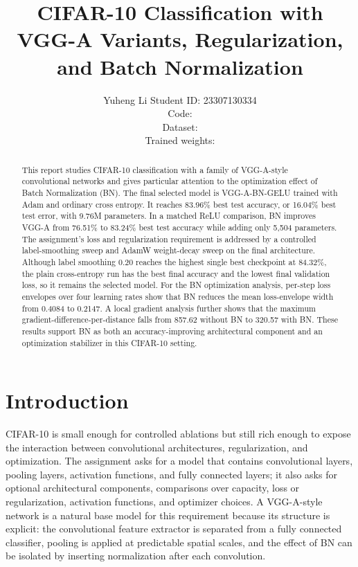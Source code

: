 \documentclass[10pt,twocolumn]{article}
\title{\vspace{-0.40in}CIFAR-10 Classification with VGG-A Variants, Regularization, and Batch Normalization}
\author{\small Yuheng Li \quad Student ID: 23307130334\\
\small Code: \githubrepo\\
\small Dataset: \cifarten\\
\small Trained weights: \modelscope}
\date{}
\begin{document}
\maketitle
\vspace{-0.20in}

\begin{abstract}
This report studies CIFAR-10 classification with a family of VGG-A-style convolutional networks and gives particular attention to the optimization effect of Batch Normalization (BN). The final selected model is VGG-A-BN-GELU trained with Adam and ordinary cross entropy. It reaches 83.96\% best test accuracy, or 16.04\% best test error, with 9.76M parameters. In a matched ReLU comparison, BN improves VGG-A from 76.51\% to 83.24\% best test accuracy while adding only 5,504 parameters. The assignment's loss and regularization requirement is addressed by a controlled label-smoothing sweep and AdamW weight-decay sweep on the final architecture. Although label smoothing 0.20 reaches the highest single best checkpoint at 84.32\%, the plain cross-entropy run has the best final accuracy and the lowest final validation loss, so it remains the selected model. For the BN optimization analysis, per-step loss envelopes over four learning rates show that BN reduces the mean loss-envelope width from 0.4084 to 0.2147. A local gradient analysis further shows that the maximum gradient-difference-per-distance falls from 857.62 without BN to 320.57 with BN. These results support BN as both an accuracy-improving architectural component and an optimization stabilizer in this CIFAR-10 setting.
\end{abstract}

\section{Introduction}
CIFAR-10 is small enough for controlled ablations but still rich enough to expose the interaction between convolutional architectures, regularization, and optimization. The assignment asks for a model that contains convolutional layers, pooling layers, activation functions, and fully connected layers; it also asks for optional architectural components, comparisons over capacity, loss or regularization, activation functions, and optimizer choices. A VGG-A-style network is a natural base model for this requirement because its structure is explicit: the convolutional feature extractor is separated from a fully connected classifier, pooling is applied at predictable spatial scales, and the effect of BN can be isolated by inserting normalization after each convolution.
\end{document}
